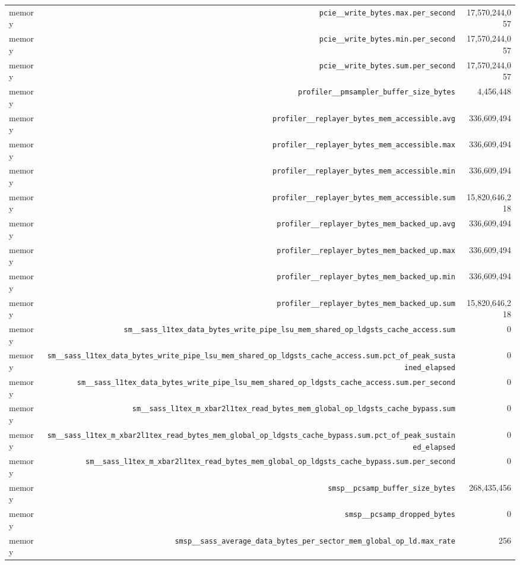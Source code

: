 \begin{table}[h]
\begin{tabular}{|l|r|r|}
memory & \texttt{pcie__write_bytes.max.per_second} & 17,570,244,057 \\
memory & \texttt{pcie__write_bytes.min.per_second} & 17,570,244,057 \\
memory & \texttt{pcie__write_bytes.sum.per_second} & 17,570,244,057 \\
memory & \texttt{profiler__pmsampler_buffer_size_bytes} & 4,456,448 \\
memory & \texttt{profiler__replayer_bytes_mem_accessible.avg} & 336,609,494 \\
memory & \texttt{profiler__replayer_bytes_mem_accessible.max} & 336,609,494 \\
memory & \texttt{profiler__replayer_bytes_mem_accessible.min} & 336,609,494 \\
memory & \texttt{profiler__replayer_bytes_mem_accessible.sum} & 15,820,646,218 \\
memory & \texttt{profiler__replayer_bytes_mem_backed_up.avg} & 336,609,494 \\
memory & \texttt{profiler__replayer_bytes_mem_backed_up.max} & 336,609,494 \\
memory & \texttt{profiler__replayer_bytes_mem_backed_up.min} & 336,609,494 \\
memory & \texttt{profiler__replayer_bytes_mem_backed_up.sum} & 15,820,646,218 \\
memory & \texttt{sm__sass_l1tex_data_bytes_write_pipe_lsu_mem_shared_op_ldgsts_cache_access.sum} & 0 \\
memory & \texttt{sm__sass_l1tex_data_bytes_write_pipe_lsu_mem_shared_op_ldgsts_cache_access.sum.pct_of_peak_sustained_elapsed} & 0 \\
memory & \texttt{sm__sass_l1tex_data_bytes_write_pipe_lsu_mem_shared_op_ldgsts_cache_access.sum.per_second} & 0 \\
memory & \texttt{sm__sass_l1tex_m_xbar2l1tex_read_bytes_mem_global_op_ldgsts_cache_bypass.sum} & 0 \\
memory & \texttt{sm__sass_l1tex_m_xbar2l1tex_read_bytes_mem_global_op_ldgsts_cache_bypass.sum.pct_of_peak_sustained_elapsed} & 0 \\
memory & \texttt{sm__sass_l1tex_m_xbar2l1tex_read_bytes_mem_global_op_ldgsts_cache_bypass.sum.per_second} & 0 \\
memory & \texttt{smsp__pcsamp_buffer_size_bytes} & 268,435,456 \\
memory & \texttt{smsp__pcsamp_dropped_bytes} & 0 \\
memory & \texttt{smsp__sass_average_data_bytes_per_sector_mem_global_op_ld.max_rate} & 256 \\

\end{tabular}
\end{table}
